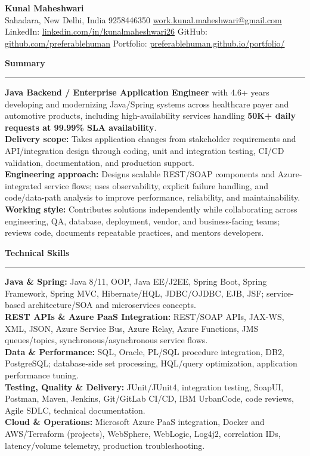 \documentclass[11pt,letterpaper]{article}
\newcommand{\ressection}[1]{\Needspace{6\baselineskip}\vspace{8pt}\par\textbf{#1}\par\vspace{2pt}\hrule\vspace{5pt}}
\begin{document}
\pagestyle{empty}\raggedright\fontsize{11}{12.5}\selectfont

{\Large \textbf{Kunal Maheshwari}}\\
Sahadara, New Delhi, India \textbar{} 9258446350 \textbar{} \href{mailto:work.kunal.maheshwari@gmail.com}{work.kunal.maheshwari@gmail.com}\\
LinkedIn: \href{https://www.linkedin.com/in/kunalmaheshwari26}{linkedin.com/in/kunalmaheshwari26} \textbar{} GitHub: \href{https://github.com/preferablehuman}{github.com/preferablehuman} \textbar{} Portfolio: \href{https://preferablehuman.github.io/portfolio/}{preferablehuman.github.io/portfolio/}

\ressection{Summary}
\textbf{Java Backend / Enterprise Application Engineer} with 4.6+ years developing and modernizing Java/Spring systems across healthcare payer and automotive products, including high-availability services handling \textbf{50K+ daily requests at 99.99\% SLA availability}.\\[2pt]
\textbf{Delivery scope:} Takes application changes from stakeholder requirements and API/integration design through coding, unit and integration testing, CI/CD validation, documentation, and production support.\\[2pt]
\textbf{Engineering approach:} Designs scalable REST/SOAP components and Azure-integrated service flows; uses observability, explicit failure handling, and code/data-path analysis to improve performance, reliability, and maintainability.\\[2pt]
\textbf{Working style:} Contributes solutions independently while collaborating across engineering, QA, database, deployment, vendor, and business-facing teams; reviews code, documents repeatable practices, and mentors developers.

\ressection{Technical Skills}
\textbf{Java \& Spring:} Java 8/11, OOP, Java EE/J2EE, Spring Boot, Spring Framework, Spring MVC, Hibernate/HQL, JDBC/OJDBC, EJB, JSF; service-based architecture/SOA and microservices concepts.\\
\textbf{REST APIs \& Azure PaaS Integration:} REST/SOAP APIs, JAX-WS, XML, JSON, Azure Service Bus, Azure Relay, Azure Functions, JMS queues/topics, synchronous/asynchronous service flows.\\
\textbf{Data \& Performance:} SQL, Oracle, PL/SQL procedure integration, DB2, PostgreSQL; database-side set processing, HQL/query optimization, application performance tuning.\\
\textbf{Testing, Quality \& Delivery:} JUnit/JUnit4, integration testing, SoapUI, Postman, Maven, Jenkins, Git/GitLab CI/CD, IBM UrbanCode, code reviews, Agile SDLC, technical documentation.\\
\textbf{Cloud \& Operations:} Microsoft Azure PaaS integration, Docker and AWS/Terraform (projects), WebSphere, WebLogic, Log4j2, correlation IDs, latency/volume telemetry, production troubleshooting.
\end{document}
